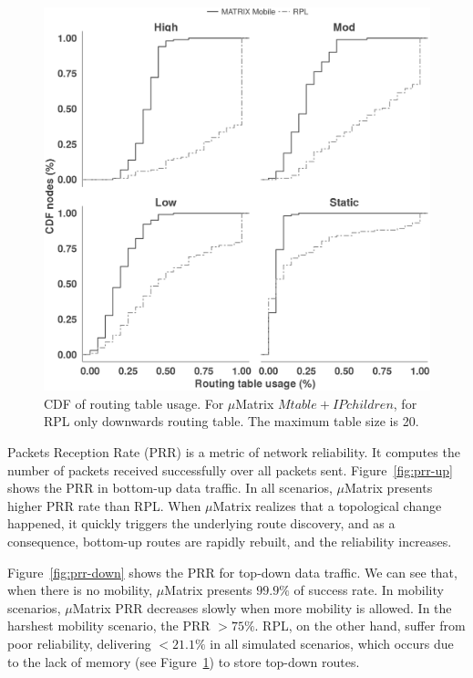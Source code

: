 \begin{figure}[!t]
\centering
\includegraphics[width=.89\linewidth]{img/cdf-memory-grid}
\caption{CDF of routing table usage. For $\mu$Matrix $Mtable + IPchildren$, for RPL only downwards routing table. The  maximum table size is 20.}
\label{fig:memory-usage}
\end{figure}

Packets Reception Rate (PRR) is a metric of network reliability. It computes the number of packets received successfully over all packets sent. Figure~\ref{fig:prr-up} shows the PRR in bottom-up data traffic. In all scenarios, $\mu$Matrix presents higher PRR rate than RPL. When $\mu$Matrix realizes that a topological change happened, it quickly triggers the underlying route discovery, and as a consequence, bottom-up routes are rapidly rebuilt, and the reliability increases. 

Figure~\ref{fig:prr-down} shows the PRR for top-down data traffic. We can see that, when there is no mobility, $\mu$Matrix presents $99.9\%$ of success rate. In mobility scenarios, $\mu$Matrix PRR decreases slowly when more mobility is allowed. In the harshest mobility
scenario, the PRR $>75\%$. RPL, on the other hand, suffer from poor reliability, delivering $< 21.1 \%$ in all simulated scenarios, which occurs due to the lack of memory (see Figure~\ref{fig:memory-usage}) to store top-down routes.

